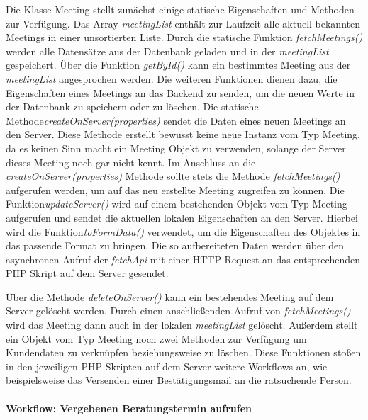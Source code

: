 Die Klasse Meeting stellt zunächst einige statische Eigenschaften und Methoden
zur Verfügung. Das Array \textit{meetingList} enthält zur Laufzeit alle aktuell
bekannten Meetings in einer unsortierten Liste. Durch die statische Funktion
\textit{fetchMeetings()} werden alle Datensätze aus der Datenbank geladen und
in der \textit{meetingList} gespeichert. Über die Funktion \textit{getById()}
kann ein bestimmtes Meeting aus der \textit{meetingList} angesprochen werden.
Die weiteren Funktionen dienen dazu, die Eigenschaften eines Meetings an das
Backend zu senden, um die neuen Werte in der Datenbank zu speichern oder zu
löschen. Die statische Methode\textit{createOnServer(properties)} sendet die
Daten eines neuen Meetings an den Server. Diese Methode erstellt bewusst keine
neue Instanz vom Typ Meeting, da es keinen Sinn macht ein Meeting Objekt zu
verwenden, solange der Server dieses Meeting noch gar nicht kennt. Im Anschluss
an die \textit{createOnServer(properties)} Methode sollte stets die Methode
\textit{fetchMeetings()} aufgerufen werden, um auf das neu erstellte Meeting
zugreifen zu können. Die Funktion\textit{updateServer()} wird auf einem
bestehenden Objekt vom Typ Meeting aufgerufen und sendet die aktuellen lokalen
Eigenschaften an den Server. Hierbei wird die Funktion\textit{toFormData()}
verwendet, um die Eigenschaften des Objektes in das passende Format zu bringen.
Die so aufbereiteten Daten werden über den asynchronen Aufruf der
\textit{fetchApi}\cite{fetchAPI} mit einer HTTP Request an das entsprechenden
PHP Skript auf dem Server gesendet.



Über die Methode \textit{deleteOnServer()} kann ein bestehendes Meeting auf dem Server gelöscht werden. Durch einen anschließenden Aufruf von \textit{fetchMeetings()} wird das Meeting dann auch in der lokalen \textit{meetingList} gelöscht. Außerdem stellt ein Objekt vom Typ Meeting noch zwei Methoden zur Verfügung um Kundendaten zu verknüpfen beziehungsweise zu löschen. Diese Funktionen stoßen in den jeweiligen PHP Skripten auf dem Server weitere Workflows an, wie beispielsweise das Versenden einer Bestätigungsmail an die ratsuchende Person.



\paragraph{Workflow: Vergebenen Beratungstermin aufrufen}


